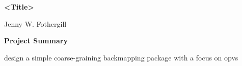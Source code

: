 

%
%
%
%
%
%

\begin{center}
\large{\textbf{<Title>}}
\end{center}
\begin{center}
    Jenny W. Fothergill
\end{center}
\begin{center}
    \textbf{Project Summary}
\end{center}

%
design a simple coarse-graining backmapping package with a focus on opvs


